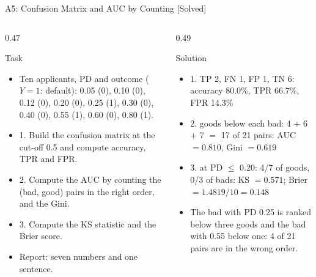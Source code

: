 \begin{frame}{A5: Confusion Matrix and AUC by Counting [Solved]}
\itemsize{\scriptsize}
\begin{columns}[T]
\begin{column}{0.47\textwidth}
\begin{block}{Task}
\begin{itemize}
    \item Ten applicants, PD and outcome ($Y = 1$: default): 0.05 (0), 0.10 (0), 0.12 (0), 0.20 (0), 0.25 (1), 0.30 (0), 0.40 (0), 0.55 (1), 0.60 (0), 0.80 (1).
    \item 1. Build the confusion matrix at the cut-off 0.5 and compute accuracy, TPR and FPR.
    \item 2. Compute the AUC by counting the (bad, good) pairs in the right order, and the Gini.
    \item 3. Compute the KS statistic and the Brier score.
    \item Report: seven numbers and one sentence.
\end{itemize}
\end{block}
\end{column}
\begin{column}{0.49\textwidth}
\begin{exampleblock}{Solution}
\begin{itemize}
    \item 1. TP 2, FN 1, FP 1, TN 6: accuracy 80.0\%, TPR 66.7\%, FPR 14.3\%
    \item 2. goods below each bad: 4 + 6 + 7 $=$ 17 of 21 pairs: AUC $= 0.810$, Gini $= 0.619$
    \item 3. at PD $\le$ 0.20: 4/7 of goods, 0/3 of bads: KS $= 0.571$; Brier $= 1.4819/10 = 0.148$
    \item The bad with PD 0.25 is ranked below three goods and the bad with 0.55 below one: 4 of 21 pairs are in the wrong order.
\end{itemize}
\end{exampleblock}
\end{column}
\end{columns}
\end{frame}

